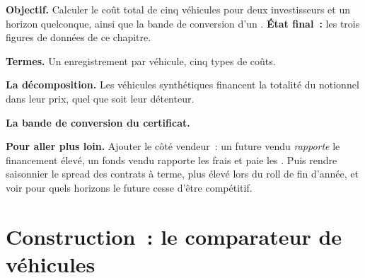 \begin{tutorial}
\textbf{Objectif.} Calculer le coût total de cinq véhicules pour deux investisseurs
et un horizon quelconque, ainsi que la bande de conversion d'un . \textbf{État final~:}
les trois figures de données de ce chapitre.
\begin{tutsteps}
\item \textbf{Termes.} Un enregistrement par véhicule, cinq types de coûts.
\label{lst:m1:delta-one-instruments:terms}
\item \textbf{La décomposition.} Les véhicules synthétiques financent la totalité du notionnel
dans leur prix, quel que soit leur détenteur.
\label{lst:m1:delta-one-instruments:breakdown}
\item \textbf{La bande de conversion du certificat.}
\label{lst:m1:delta-one-instruments:band}
\end{tutsteps}
\textbf{Pour aller plus loin.} Ajouter le côté vendeur~: un future vendu
\emph{rapporte} le financement élevé, un fonds vendu rapporte les frais et paie les
. Puis rendre saisonnier le spread des contrats à terme, plus élevé lors du
roll de fin d'année, et voir pour quels horizons le future cesse d'être compétitif.
\end{tutorial}

\section{Construction~: le comparateur de véhicules}\label{bld:m1:delta-one-instruments:comparator}

